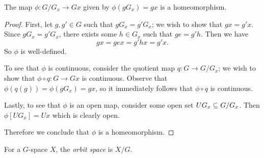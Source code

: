 \begin{remark}
    The map $\phi : G/G_x \to Gx$ given by $\phi(gG_x) = gx$ is a homeomorphism.
    \begin{proof}
        First, let $g,g' \in G$ such that $g G_x = g' G_x$; we wish to show that $g x = g' x$.
        Since $g G_x = g' G_x$, there exists some $h \in G_x$ such that $g e = g' h$.
        Then we have
        \[
            g x
            = g e x
            = g' h x
            = g' x.
        \]
        So $\phi$ is well-defined.
        
        To see that $\phi$ is continuous, consider the quotient map $q : G \to G/G_x$; we wish to show that $\phi \circ q : G \to Gx$ is continuous.
        Observe that $\phi(q(g)) = \phi(gG_x) = gx$, so it immediately follows that $\phi \circ q$ is continuous.
        
        Lastly, to see that $\phi$ is an open map, consider some open set $UG_x \subseteq G/G_x$.
        Then $\phi[UG_x] = Ux$ which is clearly open.
        
        Therefore we conclude that $\phi$ is a homeomorphism.
    \end{proof}
\end{remark}

\begin{definition}
    For a $G$-space $X$, the \emph{orbit space} is $X/G$.
\end{definition}

